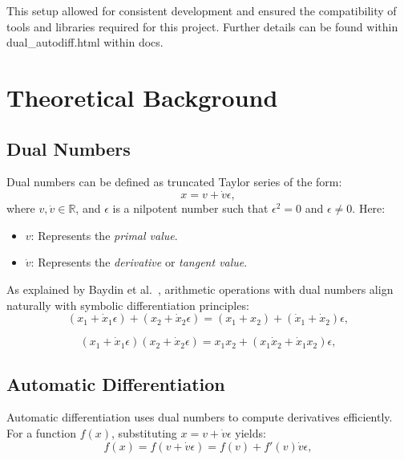 \documentclass[a4paper,12pt]{article}
\begin{document}
This setup allowed for consistent development and ensured the compatibility of tools and libraries required for this project. Further details can be found within dual\_autodiff.html within docs.

\section{Theoretical Background}

\subsection{Dual Numbers}
Dual numbers can be defined as truncated Taylor series of the form:
\begin{equation}
    x = v + \dot{v}\epsilon,
    \label{eq:dual_number_form}
    \end{equation}
where \(v, \dot{v} \in \mathbb{R}\), and \(\epsilon\) is a nilpotent number such that \(\epsilon^2 = 0\) and \(\epsilon \neq 0\). Here:
\begin{itemize}
    \item \(v\): Represents the \textit{primal value}.
    \item \(\dot{v}\): Represents the \textit{derivative} or \textit{tangent value}.
\end{itemize}

As explained by Baydin et al.~\cite{baydin2018automatic}, arithmetic operations with dual numbers align naturally with symbolic differentiation principles:
\begin{equation}
    (x_1 + \dot{x}_1\epsilon) + (x_2 + \dot{x}_2\epsilon) = (x_1 + x_2) + (\dot{x}_1 + \dot{x}_2)\epsilon,
    \label{eq:dual_addition}
    \end{equation}
    
    \begin{equation}
    (x_1 + \dot{x}_1\epsilon)(x_2 + \dot{x}_2\epsilon) = x_1x_2 + (x_1\dot{x}_2 + \dot{x}_1x_2)\epsilon,
    \label{eq:dual_multiplication}
    \end{equation}
    

\subsection{Automatic Differentiation}
Automatic differentiation uses dual numbers to compute derivatives efficiently. For a function \(f(x)\), substituting \(x = v + \dot{v}\epsilon\) yields:
\begin{equation}
    f(x) = f(v + \dot{v}\epsilon) = f(v) + f'(v)\dot{v}\epsilon,
    \label{eq:dual_function}
    \end{equation}
    
\end{document}
